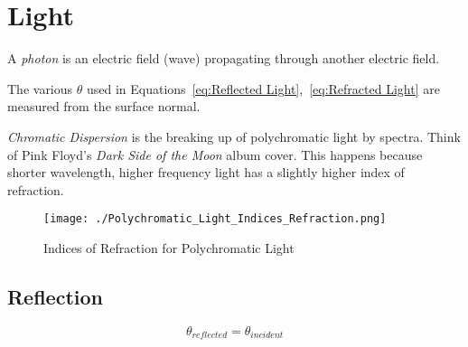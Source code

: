 \section{Light}\label{sec:Light}
\begin{definition}[Photon]
  A \emph{photon} is an electric field (wave) propagating through another electric field.
\end{definition}
The various $\theta$ used in Equations~\eqref{eq:Reflected Light},~\eqref{eq:Refracted Light} are measured from the surface normal.

\emph{Chromatic Dispersion} is the breaking up of polychromatic light by spectra.
Think of Pink Floyd's \textit{Dark Side of the Moon} album cover.
This happens because shorter wavelength, higher frequency light has a slightly higher index of refraction.
\begin{figure}[h!]
  \centering
  \texttt{[image: ./Polychromatic\_Light\_Indices\_Refraction.png]}
  \caption{Indices of Refraction for Polychromatic Light}
  \label{fig:Indices of Refraction for Polychromatic Light}
\end{figure}

\subsection{Reflection}\label{subsec:Reflection}
\begin{equation}\label{eq:Reflected Light}
  \theta_{reflected} = \theta_{incident}
\end{equation}

